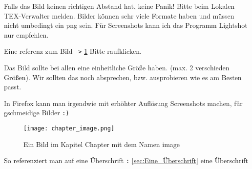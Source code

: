 Falls das Bild keinen richtigen Abstand hat, keine Panik! Bitte beim Lokalen TEX-Verwalter melden.
Bilder können sehr viele Formate haben und müssen nicht umbedingt ein png sein.
Für Screenshots kann ich das Programm Lightshot nur empfehlen.

Eine referenz zum Bild \verb+->+ \ref{chapter:image} Bitte raufklicken.

Das Bild sollte bei allen eine einheitliche Größe haben. (max. 2 verschieden Größen). Wir sollten das noch absprechen,
bzw. ausprobieren wie es am Besten passt.

In Firefox kann man irgendwie mit erhöhter Auflösung Screenshots machen, für gschmeidige Bilder \verb-:)-

\begin{figure}[h]
    \centering
    \texttt{[image: chapter\_image.png]}
    \caption{Ein Bild im Kapitel Chapter mit dem Namen image}
    \label{chapter:image}
\end{figure}

So referenziert man auf eine Überschrift \verb-:- \autoref{sec:Eine_Überschrift} eine Überschrift